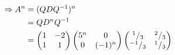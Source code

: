\begin{align}
\Rightarrow A^n &= (QDQ^{-1})^n\\
&= QD^nQ^{-1}\\
&= \begin{pmatrix}
1 & -2\\
1 & 1
\end{pmatrix}
\begin{pmatrix}
5^n & 0\\
0 & (-1)^n
\end{pmatrix}
\begin{pmatrix}
^{1}/_{3} & ^{2}/_{3}\\
^{-1}/_{3} & ^{1}/_{3}
\end{pmatrix}
\end{align}
